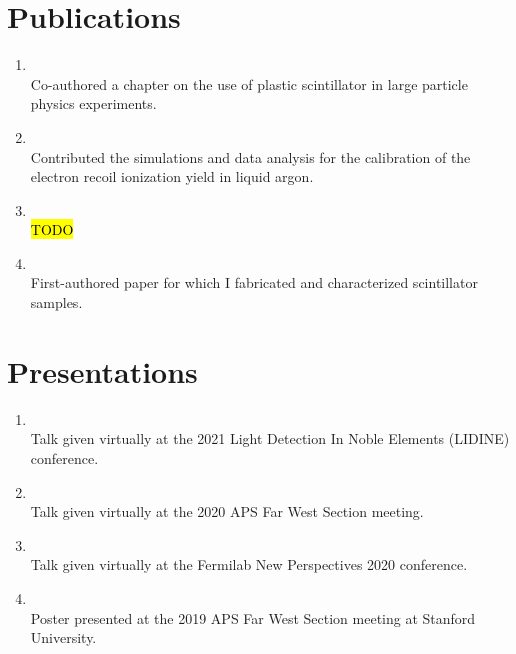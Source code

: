 \section{Publications}

\begin{enumerate}[leftmargin=*]
  \item {} \\
    {\footnotesize Co-authored a chapter on the use of plastic scintillator in large particle physics experiments.}
  \item {} \\
    {\footnotesize Contributed the simulations and data analysis for the calibration of the electron recoil ionization yield in liquid argon.}
  \item {} \\
    {\footnotesize \hl{TODO}}
  \item {} \\
    {\footnotesize First-authored paper for which I fabricated and characterized scintillator samples.}
  \end{enumerate}


\section{Presentations}
\begin{enumerate}[leftmargin=*]
  \item {} \\
    {\footnotesize Talk given virtually at the 2021 Light Detection In Noble Elements (LIDINE) conference.}
  \item {} \\
    {\footnotesize Talk given virtually at the 2020 APS Far West Section meeting.}
  \item {} \\
    {\footnotesize Talk given virtually at the Fermilab New Perspectives 2020 conference.}
  \item {} \\
    {\footnotesize Poster presented at the 2019 APS Far West Section meeting at Stanford University.}
\end{enumerate}